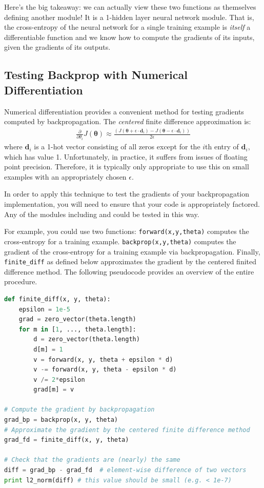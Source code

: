 \documentclass[11pt,addpoints,answers]{exam}
\newcommand{\vc}[1]{\boldsymbol{#1}}
\begin{document}
Here's the big takeaway: we can actually view these two functions as themselves defining another module! It is a 1-hidden layer neural network module. That is, the cross-entropy of the neural network for a single training example is \emph{itself} a differentiable function and we know how to compute the gradients of its inputs, given the gradients of its outputs. 

\subsection{Testing Backprop with Numerical Differentiation}
\label{sec:finitediff}

Numerical differentiation provides a convenient method for testing
gradients computed by backpropagation. The \emph{centered}
finite difference approximation is:
\begin{align}
\frac{\partial}{\partial \theta_i} J(\vc{\theta}) \approx \frac{\left( J(\vc{\theta} + \epsilon \cdot \vc{d}_i) - J(\vc{\theta} - \epsilon \cdot \vc{d}_i) \right)}{2\epsilon} 
\end{align}
where $\vc{d}_i$ is a 1-hot vector consisting of all zeros except for
the $i$th entry of $\vc{d}_i$, which has value 1.  Unfortunately, in
practice, it suffers from issues of floating point
precision. Therefore, it is typically only appropriate to use this on
small examples with an appropriately chosen $\epsilon$.

In order to apply this technique to test the gradients of your backpropagation implementation, you will need to ensure that your code is appropriately factored. Any of the modules including  and  could be tested in this way.
%

For example, you could use two functions: \lstinline{forward(x,y,theta)} computes the cross-entropy for a training example. \lstinline{backprop(x,y,theta)} computes the gradient of the cross-entropy for a training example via backpropagation. Finally, \lstinline{finite_diff} as defined below approximates the gradient by the centered finited difference method. The following pseudocode provides an overview of the entire procedure.

\begin{lstlisting}[language=Python]
def finite_diff(x, y, theta):
    epsilon = 1e-5
    grad = zero_vector(theta.length)
    for m in [1, ..., theta.length]:
        d = zero_vector(theta.length)
        d[m] = 1
        v = forward(x, y, theta + epsilon * d)
        v -= forward(x, y, theta - epsilon * d)
        v /= 2*epsilon
        grad[m] = v
        
# Compute the gradient by backpropagation
grad_bp = backprop(x, y, theta)
# Approximate the gradient by the centered finite difference method
grad_fd = finite_diff(x, y, theta)

# Check that the gradients are (nearly) the same
diff = grad_bp - grad_fd  # element-wise difference of two vectors
print l2_norm(diff) # this value should be small (e.g. < 1e-7)
\end{lstlisting}
\end{document}
